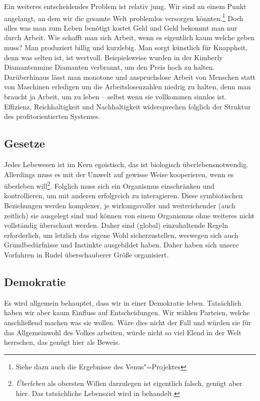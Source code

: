 Ein weiteres entscheidendes Problem ist relativ jung. Wir sind an einem Punkt angelangt, an dem wir die gesamte Welt problemlos versorgen könnten.\footnote{Siehe dazu auch die Ergebnisse des Venus"=Projektes} Doch alles was man zum Leben benötigt kostet Geld und Geld bekommt man nur durch Arbeit. Wie schafft man sich Arbeit, wenn es eigentlich kaum welche geben muss? Man produziert billig und kurzlebig. Man sorgt künstlich für Knappheit, denn was selten ist, ist wertvoll. Beispielsweise wurden in der Kimberly Diamantenmine Diamanten verbrannt, um den Preis hoch zu halten. Darüberhinaus lässt man monotone und anspruchslose Arbeit von Menschen statt von Maschinen erledigen um die Arbeitslosenzahlen niedrig zu halten, denn man braucht ja Arbeit, um zu leben -- selbst wenn sie vollkommen sinnlos ist. Effizienz, Reichhaltigkeit und Nachhaltigkeit widersprechen folglich der Struktur des profitorientierten Systemes.

\subsection{Gesetze}\label{sec:situation/laws}

Jedes Lebewesen ist im Kern egoistisch, das ist biologisch überlebensnotwendig. Allerdings muss es mit der Umwelt auf gewisse Weise kooperieren, wenn es überleben will\footnote{\textit{Überleben} als obersten Willen darzulegen ist eigentlich falsch, genügt aber hier. Das tatsächliche Lebensziel wird in  behandelt.}. Folglich muss sich ein Organismus einschränken und kontrollieren, um mit anderen erfolgreich zu interagieren. Diese symbiotischen Beziehungen werden komplexer, je wirkungsvoller und weitreichender (auch zeitlich) sie ausgelegt sind und können von einem Organismus ohne weiteres nicht vollständig überschaut werden. Daher sind (global) einzuhaltende Regeln erforderlich, um letzlich das eigene Wohl sicherzustellen, weswegen sich auch Grundbedürfnisse und Instinkte ausgebildet haben. Daher haben sich unsere Vorfahren in Rudel überschauberer Größe organisiert.

\subsection{Demokratie}\label{sec:situation/democracy}

Es wird allgemein behauptet, dass wir in einer Demokratie leben. Tatsächlich haben wir aber kaum Einfluss auf Entscheidungen. Wir wählen Parteien, welche anschließend machen was sie wollen. Wäre dies nicht der Fall und würden sie für das Allgemeinwohl des Volkes arbeiten, würde nicht so viel Elend in der Welt herrschen, das genügt hier als Beweis.

